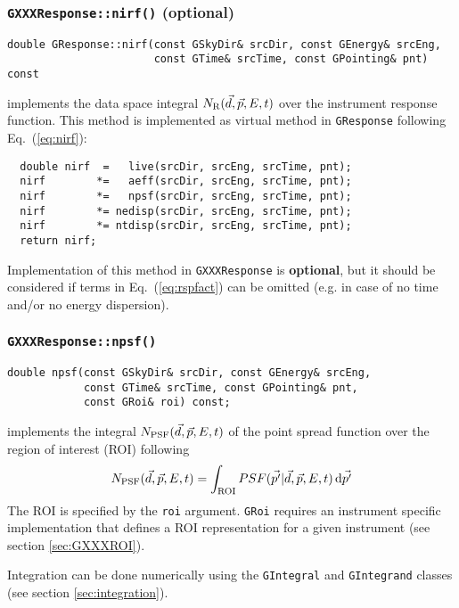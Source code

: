 \documentclass{article}[12pt,a4]
\begin{document}
\subsubsection{{\tt GXXXResponse::nirf()} (optional)}

\begin{verbatim}
double GResponse::nirf(const GSkyDir& srcDir, const GEnergy& srcEng,
                       const GTime& srcTime, const GPointing& pnt) const
\end{verbatim}
implements the data space integral $N_{\rm R}(\vec{d}, \vec{p}, E, t)$ over the instrument
response function.
This method is implemented as virtual method in {\tt GResponse} following
Eq.~(\ref{eq:nirf}):
\begin{verbatim}
  double nirf  =   live(srcDir, srcEng, srcTime, pnt);
  nirf        *=   aeff(srcDir, srcEng, srcTime, pnt);
  nirf        *=   npsf(srcDir, srcEng, srcTime, pnt);
  nirf        *= nedisp(srcDir, srcEng, srcTime, pnt);
  nirf        *= ntdisp(srcDir, srcEng, srcTime, pnt);
  return nirf;
\end{verbatim}
Implementation of this method in {\tt GXXXResponse} is {\bf optional}, but it should
be considered if terms in Eq.~(\ref{eq:rspfact}) can be omitted (e.g. in case of no time
and/or no energy dispersion).


\subsubsection{{\tt GXXXResponse::npsf()}}

\begin{verbatim}
double npsf(const GSkyDir& srcDir, const GEnergy& srcEng,
            const GTime& srcTime, const GPointing& pnt,
            const GRoi& roi) const;
\end{verbatim}
implements the integral $N_{\rm PSF}(\vec{d}, \vec{p}, E, t)$ of the point spread function 
over the region of interest (ROI) following
\begin{equation}
N_{\rm PSF}(\vec{d}, \vec{p}, E, t) = \int_{\rm ROI} PSF(\vec{p'} | \vec{d}, \vec{p}, E, t) \, {\rm d}\vec{p'}
\label{eq:npsf}
\end{equation}
The ROI is specified by the {\tt roi} argument.
{\tt GRoi} requires an instrument specific implementation that defines a ROI
representation for a given instrument (see section \ref{sec:GXXXROI}).

Integration can be done numerically using the {\tt GIntegral} and {\tt GIntegrand}
classes (see section \ref{sec:integration}).
\end{document}
